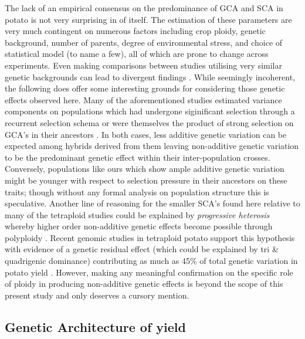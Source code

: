 The lack of an empirical consensus on the predominance of GCA and SCA in potato is not very surprising in of itself. The estimation of these parameters are very much contingent on numerous factors including crop ploidy, genetic background, number of parents, degree of environmental stress, and choice of statistical model (to name a few), all of which are prone to change across experiments. Even making comparisons between studies utilising very similar genetic backgrounds can lead to divergent findings \parencite{Tarn1977, Maris1989}. While seemingly incoherent, the following does offer some interesting grounds for considering those genetic effects observed here. Many of the aforementioned studies estimated variance components on populations which had undergone siginificant selection through a recurrent selection schema \parencite{Haynes2001, Maris1989} or were themselves the product of strong selection on GCA's in their ancestors \parencite{Tai1976}. In both cases, less additive genetic variation can be expected among hybrids derived from them leaving non-additive genetic variation to be the predominant genetic effect within their inter-population crosses. Conversely, populations like ours which show ample additive genetic variation might be younger with respect to selection pressure in their ancestors on these traits; though without any formal analysis on population structure this is speculative. Another line of reasoning for the smaller SCA's found here relative to many of the tetraploid studies could be explained by \emph{progressive heterosis} whereby higher order non-additive genetic effects become possible through polyploidy \parencite{Birchler2003}. Recent genomic studies in tetraploid potato support this hypothesis with evidence of a genetic residual effect (which could be explained by tri \& quadrigenic dominance) contributing as much as 45\% of total genetic variation in potato yield \parencite{Endelman2018}. However, making any meaningful confirmation on the specific role of ploidy in producing non-additive genetic effects is beyond the scope of this present study and only deserves a cursory mention.

\subsection{Genetic Architecture of yield}\label{genetic-architecture-of-yield}

